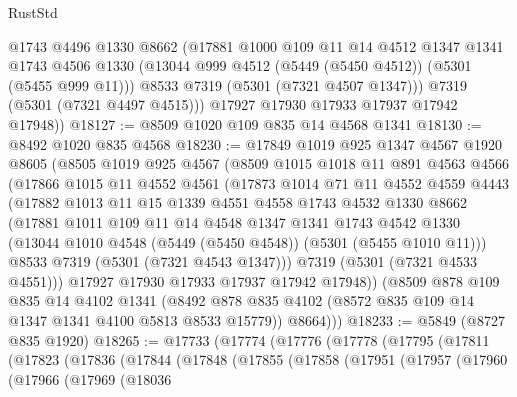 \begin{lexlean}{RustStd}
\begin{coremodule}
          @1743
          @4496
          @1330
          @8662
          (@17881
            @1000
            @109
            @11
            @14
            @4512
            @1347
            @1341
            @1743
            @4506
            @1330
            (@13044 @999 @4512 (@5449 (@5450 @4512)) (@5301 (@5455 @999 @11)))
            @8533
            @7319
            (@5301 (@7321 @4507 @1347)))
          @7319
          (@5301 (@7321 @4497 @4515)))
        @17927
        @17930
        @17933
        @17937
        @17942
        @17948))
@18127 := @8509 @1020 @109 @835 @14 @4568 @1341
@18130 := @8492 @1020 @835 @4568
@18230 := @17849
    @1019
    @925
    @1347
    @4567
    @1920
    @8605
    (@8505
      @1019
      @925
      @4567
      (@8509
        @1015
        @1018
        @11
        @891
        @4563
        @4566
        (@17866
          @1015
          @11
          @4552
          @4561
          (@17873
            @1014
            @71
            @11
            @4552
            @4559
            @4443
            (@17882
              @1013
              @11
              @15
              @1339
              @4551
              @4558
              @1743
              @4532
              @1330
              @8662
              (@17881
                @1011
                @109
                @11
                @14
                @4548
                @1347
                @1341
                @1743
                @4542
                @1330
                (@13044 @1010 @4548 (@5449 (@5450 @4548)) (@5301 (@5455 @1010 @11)))
                @8533
                @7319
                (@5301 (@7321 @4543 @1347)))
              @7319
              (@5301 (@7321 @4533 @4551)))
            @17927
            @17930
            @17933
            @17937
            @17942
            @17948))
        (@8509
          @878
          @109
          @835
          @14
          @4102
          @1341
          (@8492 @878 @835 @4102 (@8572 @835 @109 @14 @1347 @1341 @4100 @5813 @8533 @15779))
          @8664)))
@18233 := @5849 (@8727 @835 @1920)
@18265 := @17733
    (@17774
      (@17776
        (@17778
          (@17795
            (@17811
              (@17823
                (@17836
                  (@17844
                    (@17848
                      (@17855
                        (@17858
                          (@17951
                            (@17957
                              (@17960
                                (@17966
                                  (@17969
                                    (@18036

\end{coremodule}
\end{lexlean}
